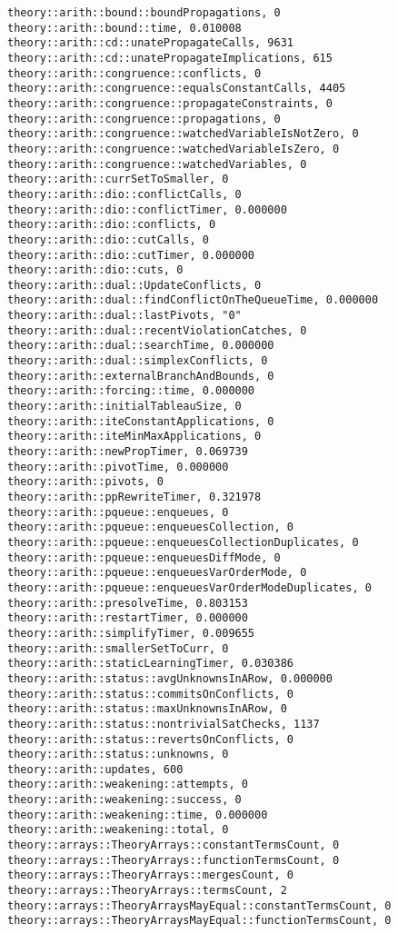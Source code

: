 \begin{lstlisting}
theory::arith::bound::boundPropagations, 0
theory::arith::bound::time, 0.010008
theory::arith::cd::unatePropagateCalls, 9631
theory::arith::cd::unatePropagateImplications, 615
theory::arith::congruence::conflicts, 0
theory::arith::congruence::equalsConstantCalls, 4405
theory::arith::congruence::propagateConstraints, 0
theory::arith::congruence::propagations, 0
theory::arith::congruence::watchedVariableIsNotZero, 0
theory::arith::congruence::watchedVariableIsZero, 0
theory::arith::congruence::watchedVariables, 0
theory::arith::currSetToSmaller, 0
theory::arith::dio::conflictCalls, 0
theory::arith::dio::conflictTimer, 0.000000
theory::arith::dio::conflicts, 0
theory::arith::dio::cutCalls, 0
theory::arith::dio::cutTimer, 0.000000
theory::arith::dio::cuts, 0
theory::arith::dual::UpdateConflicts, 0
theory::arith::dual::findConflictOnTheQueueTime, 0.000000
theory::arith::dual::lastPivots, "0"
theory::arith::dual::recentViolationCatches, 0
theory::arith::dual::searchTime, 0.000000
theory::arith::dual::simplexConflicts, 0
theory::arith::externalBranchAndBounds, 0
theory::arith::forcing::time, 0.000000
theory::arith::initialTableauSize, 0
theory::arith::iteConstantApplications, 0
theory::arith::iteMinMaxApplications, 0
theory::arith::newPropTimer, 0.069739
theory::arith::pivotTime, 0.000000
theory::arith::pivots, 0
theory::arith::ppRewriteTimer, 0.321978
theory::arith::pqueue::enqueues, 0
theory::arith::pqueue::enqueuesCollection, 0
theory::arith::pqueue::enqueuesCollectionDuplicates, 0
theory::arith::pqueue::enqueuesDiffMode, 0
theory::arith::pqueue::enqueuesVarOrderMode, 0
theory::arith::pqueue::enqueuesVarOrderModeDuplicates, 0
theory::arith::presolveTime, 0.803153
theory::arith::restartTimer, 0.000000
theory::arith::simplifyTimer, 0.009655
theory::arith::smallerSetToCurr, 0
theory::arith::staticLearningTimer, 0.030386
theory::arith::status::avgUnknownsInARow, 0.000000
theory::arith::status::commitsOnConflicts, 0
theory::arith::status::maxUnknownsInARow, 0
theory::arith::status::nontrivialSatChecks, 1137
theory::arith::status::revertsOnConflicts, 0
theory::arith::status::unknowns, 0
theory::arith::updates, 600
theory::arith::weakening::attempts, 0
theory::arith::weakening::success, 0
theory::arith::weakening::time, 0.000000
theory::arith::weakening::total, 0
theory::arrays::TheoryArrays::constantTermsCount, 0
theory::arrays::TheoryArrays::functionTermsCount, 0
theory::arrays::TheoryArrays::mergesCount, 0
theory::arrays::TheoryArrays::termsCount, 2
theory::arrays::TheoryArraysMayEqual::constantTermsCount, 0
theory::arrays::TheoryArraysMayEqual::functionTermsCount, 0

\end{lstlisting}

